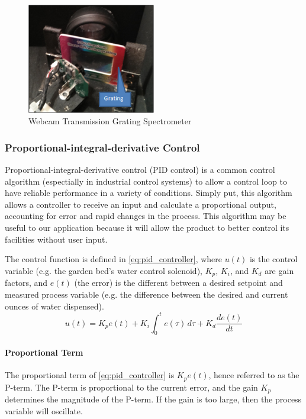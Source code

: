 \begin{figure}[H]
    \caption{Webcam Transmission Grating Spectrometer}
    \centering
    \includegraphics[width=0.5\textwidth]{images/DIYTransmissionGratingSpectrometer.png}
\end{figure}

\subsubsection{Proportional-integral-derivative Control}
Proportional-integral-derivative control (PID control) is a common control algorithm (espectially in industrial control systems) to allow a control loop to have reliable performance in a variety of conditions. Simply put, this algorithm allows a controller to receive an input and calculate a proportional output, accounting for error and rapid changes in the process. This algorithm may be useful to our application because it will allow the product to better control its facilities without user input.

The control function is defined in \autoref{eq:pid_controller}, where $u(t)$ is the control variable (e.g. the garden bed's water control solenoid), $K_p$, $K_i$, and $K_d$ are gain factors, and $e(t)$ (the error) is the different between a desired setpoint and measured process variable (e.g. the difference between the desired and current ounces of water dispensed).
\begin{equation}
    \label{eq:pid_controller}
    u(t) = K_pe(t) + K_i\int_{0}^{t}e(\tau) \, d\tau + K_d\frac{de(t)}{dt}
\end{equation}

\paragraph{Proportional Term} The proportional term of \autoref{eq:pid_controller} is $K_pe(t)$, hence referred to as the P-term. The P-term is proportional to the current error, and the gain $K_p$ determines the magnitude of the P-term. If the gain is too large, then the process variable will oscillate.

